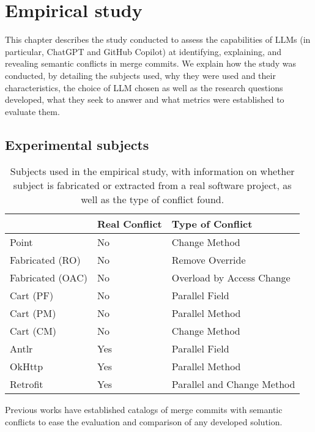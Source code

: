 \chapter{Empirical study}\label{chap:study}

This chapter describes the study conducted to assess the capabilities of LLMs
(in particular, ChatGPT and GitHub Copilot) at identifying, explaining,
and revealing semantic conflicts in merge commits.
We explain how the study was conducted, by detailing the subjects used, why they were used and their characteristics, the 
choice of LLM chosen as well as
the research questions developed, what they seek to answer and what metrics were established to evaluate them.

\section{Experimental subjects}\label{chap:study:subjects}

\begin{table}[t]
\centering
\begin{tabular}{@{\extracolsep{\fill}} lll} \toprule
                 & Real Conflict & Type of Conflict \\
\midrule
Point            & No  & Change Method \\
Fabricated (RO)  & No  & Remove Override \\
Fabricated (OAC) & No  & Overload by Access Change \\
Cart (PF)        & No  & Parallel Field \\
Cart (PM)        & No  & Parallel Method \\
Cart (CM)        & No  & Change Method \\
Antlr            & Yes & Parallel Field \\
OkHttp           & Yes & Parallel Method \\
Retrofit         & Yes & Parallel and Change Method \\
\bottomrule
\end{tabular}
\caption{Subjects used in the empirical study, with information on whether subject is fabricated or extracted from a real software project, as well as the type of conflict found.\label{tab:subjects}}
\end{table}

Previous works have established catalogs of merge commits with semantic conflicts
to ease the evaluation and comparison of any developed solution.

